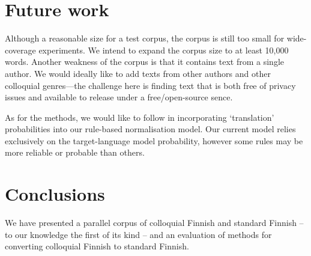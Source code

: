 \documentclass[11pt]{article}
\begin{document}



\section{Future work}

Although a reasonable size for a test corpus, the corpus is still too small for 
wide-coverage experiments. We intend to expand the corpus size to at least 10,000
words. Another weakness of the corpus is that it contains text from a single author.
We would ideally like to add texts from other authors and other colloquial genres---the 
challenge here is finding text that is both free of privacy issues and available
to release under a free/open-source sence.

As for the methods, we would like to follow  in incorporating
`translation' probabilities into our rule-based normalisation model. Our current model relies 
exclusively on the target-language model probability, however some rules may be more
reliable or probable than others.

\section{Conclusions}

We have presented a parallel corpus of colloquial Finnish and standard Finnish --
to our knowledge the first of its kind -- and an evaluation of methods for 
converting colloquial Finnish to standard Finnish. 
\end{document}
